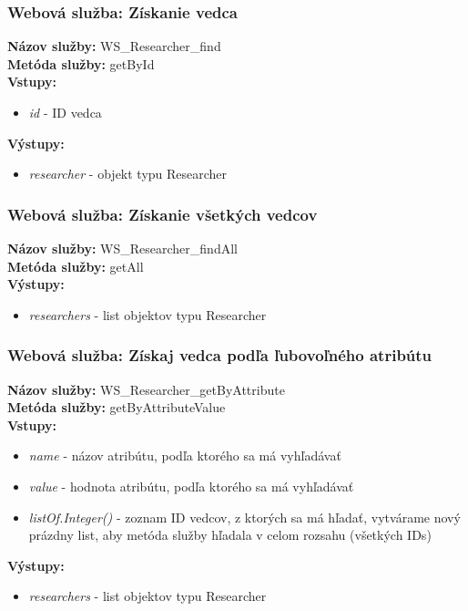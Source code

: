 \documentclass[10pt,oneside,slovak,a4paper]{article}
\begin{document}
\subsubsection{Webová služba: Získanie vedca}
\textbf{Názov služby:} WS\_Researcher\_find\\
\textbf{Metóda služby:} getById\\
\textbf{Vstupy:}
	\begin{itemize}
		\item \textit{id} - ID vedca
	\end{itemize}
\textbf{Výstupy:}
	\begin{itemize}
		\item \textit{researcher} - objekt typu Researcher
	\end{itemize}

\subsubsection{Webová služba: Získanie všetkých vedcov}
\textbf{Názov služby:} WS\_Researcher\_findAll\\
\textbf{Metóda služby:} getAll\\
\textbf{Výstupy:}
	\begin{itemize}
		\item \textit{researchers} - list objektov typu Researcher
	\end{itemize}
	
\subsubsection{Webová služba: Získaj vedca podľa ľubovoľného atribútu}
\textbf{Názov služby:} WS\_Researcher\_getByAttribute\\
\textbf{Metóda služby:} getByAttributeValue\\
\textbf{Vstupy:}
	\begin{itemize}
		\item \textit{name} - názov atribútu, podľa ktorého sa má vyhľadávať
		\item \textit{value} - hodnota atribútu, podľa ktorého sa má vyhľadávať
		\item \textit{listOf.Integer()} - zoznam ID vedcov, z ktorých sa má hľadať, vytvárame nový prázdny list, aby metóda služby hľadala v celom rozsahu (všetkých IDs)
	\end{itemize}
\textbf{Výstupy:}
	\begin{itemize}
		\item \textit{researchers} - list objektov typu Researcher 
	\end{itemize}
	
\end{document}
